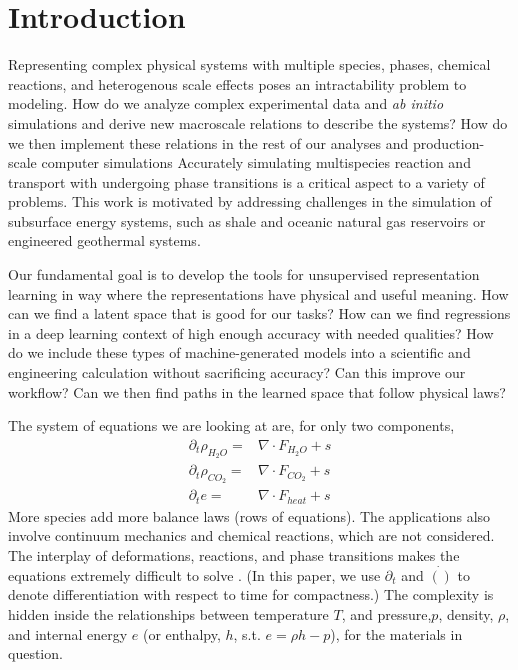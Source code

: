 \documentclass[AMA,STIX1COL]{WileyNJD-v2}
\begin{document}
\hypertarget{header-n3216}{%
\section{Introduction}\label{header-n3216}}

Representing complex physical systems with multiple species, phases,
chemical reactions, and heterogenous scale effects poses an
intractability problem to modeling. How do we analyze complex
experimental data and \emph{ab initio} simulations and derive new
macroscale relations to describe the systems? How do we then implement
these relations in the rest of our analyses and production-scale
computer simulations
Accurately simulating multispecies reaction and transport with
undergoing phase transitions is a critical aspect to a variety of
problems.
This work is motivated by addressing challenges in the simulation of subsurface energy systems, such as shale
and oceanic natural gas reservoirs or engineered geothermal
systems.

Our fundamental goal is to develop the tools
for unsupervised representation learning in way where the
representations have physical and useful meaning.
How can we find a latent space that is good for our tasks?
How can we find regressions in a deep learning context of high enough
accuracy with needed qualities?
How do we include these types of machine-generated models into a
scientific and engineering calculation without sacrificing accuracy?
Can this improve our workflow?
Can we then find paths in the learned space that follow physical laws?


The system of equations we are looking at are, for only two components,
\begin{align}
  \partial_t \rho_{H_2O} =& \nabla \cdot F_{H_2O} + s \\
  \partial_t \rho_{CO_2} =& \nabla \cdot F_{CO_2} + s \\
  \partial_t e =& \nabla \cdot F_{heat} + s
\end{align}
More species add more balance laws (rows of equations). The applications also involve continuum
mechanics and chemical reactions, which are not considered. The interplay of deformations,
reactions, and phase transitions makes the equations extremely difficult
to solve \cite{queiruga_simulation_2019}. 
(In this paper, we use $\partial_t$
and $\dot{()}$ to denote differentiation with respect to time
for compactness.)
The complexity is hidden inside the relationships between temperature
$T$, and pressure,$p$, density, $\rho$, and internal energy $e$ (or
enthalpy, $h$, s.t. $e=\rho h - p$), 
for the materials in question.
\end{document}
